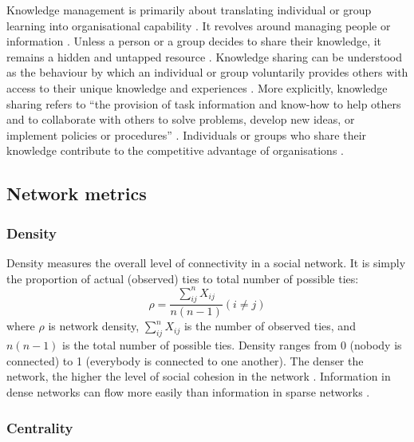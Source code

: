 Knowledge management is primarily about translating individual or group learning into organisational capability \citep{mcdermott1999information,hansen2005share,lam2010knowledge,girard2015defining}. It revolves around managing people or information \citep{alvesson2001odd}. Unless a person or a group decides to share their knowledge, it remains a hidden and untapped resource \citep{davenport1998working}. Knowledge sharing can be understood as the behaviour by which an individual or group voluntarily provides others with access to their unique knowledge and experiences \citep{cabrera2002knowledge,hansen2005share}. More explicitly, knowledge sharing refers to \enquote{the provision of task information and know-how to help others and to collaborate with others to solve problems, develop new ideas, or implement policies or procedures} \citep{wang2010knowledge}.
Individuals or groups who share their knowledge contribute to the competitive advantage of organisations \citep{papadopoulos2013exploring}. \medskip


\subsection{Network metrics}

\subsubsection{Density}

Density measures the overall level of connectivity in a social network. It is simply the proportion of actual (observed) ties to total number of possible ties:  $$\rho = \frac{\sum_{ij}^{n}X_{ij}}{n(n-1)}(i \neq j)$$ where $\rho$ is network density, $\sum_{ij}^{n}X_{ij}$ is the number of observed ties, and $n(n-1)$ is the total number of possible ties. Density ranges from 0 (nobody is connected) to 1 (everybody is connected to one another). The denser the network, the higher the level of social cohesion in the network \citep{newman2010networks}. Information in dense networks can flow more easily than information in sparse networks \citep{borgatti2013analyzing}. \medskip

\subsubsection{Centrality}

